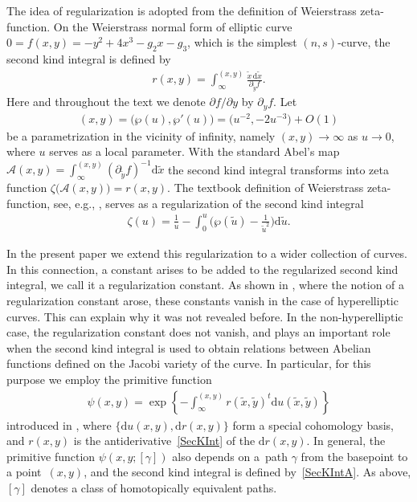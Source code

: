 \documentclass[pdftex]{sigma}
\numberwithin{equation}{section}
\newcommand{\rmd}{\mathrm{d}}
\begin{document}
The idea of regularization is adopted from the definition of Weierstrass zeta-function. On the Weierstrass normal form of elliptic curve $0=f(x,y)=-y^2 + 4x^3 - g_2 x - g_3$, which is the simplest $(n,s)$-curve, the second kind integral is defined by
\begin{gather*}
 r(x,y) = \int_{\infty}^{(x,y)} \frac{\tilde{x}\, \rmd \tilde{x}}{\partial_{\tilde{y}} f}.
\end{gather*}
Here and throughout the text we denote $\partial f/\partial y$ by $\partial_y f$. Let
\begin{gather*} (x,y)=\big(\wp(u),\wp'(u)\big)= \big(u^{-2},{-}2u^{-3}\big)+O(1)\end{gather*} be a parametrization in the vicinity of infinity, namely $(x,y)\to\infty$ as $u\to 0$, where $u$ serves as a local parameter. With the standard Abel's map $\mathcal{A}(x,y) = \int_{\infty}^{(x,y)} (\partial_{\tilde{y}} f)^{-1}\rmd \tilde{x}$ the second kind integral transforms into zeta function $\zeta \big(\mathcal{A}(x,y)\big) = r(x,y)$. The textbook definition of Weierstrass zeta-function, see, e.g., \cite[Chapter~XX, Section~20.4]{Whittaker}, serves as a regularization of the second kind integral
\begin{gather*}
 \zeta(u) = \frac{1}{u} - \int_{0}^{u} \bigg(\wp(\tilde{u}) - \frac{1}{\tilde{u}^2}\bigg) \rmd \tilde{u}.
\end{gather*}

In the present paper we extend this regularization to a wider collection of curves. In this connection, a constant arises to be added to the regularized second kind integral, we call it a regularization constant. As shown in \cite[Section~193]{BakerAF}, where the notion of a regularization constant arose, these constants vanish in the case of hyperelliptic curves. This can explain why it was not revealed before. In the non-hyperelliptic case, the regularization constant does not vanish, and plays an important role when the second kind integral is used to obtain relations between Abelian functions defined on the Jacobi variety of the curve. In particular, for this purpose we employ the primitive function
\begin{gather}\label{PsiDef0}
 \psi(x,y) = \exp\left\{-\int_{\infty}^{(x,y)} r(\tilde{x},\tilde{y})^{t} \rmd u(\tilde{x},\tilde{y}) \right\}
\end{gather}
introduced in \cite{BL2005}, where $\{\rmd u(x,y),\rmd r(x,y)\}$ form a special cohomology basis, and $r(x,y)$ is the antiderivative~\eqref{SecKInt} of the $\rmd r(x,y)$. In general, the primitive function $\psi(x,y;[\gamma])$ also depends on a~path $\gamma$ from the basepoint to a point~$(x,y)$, and the second kind integral is defined by~\eqref{SecKIntA}. As above, $[\gamma]$ denotes a class of homotopically equivalent paths.
\end{document}
